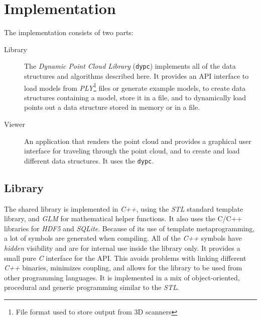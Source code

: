 \documentclass[a4paper,10pt,abstracton,notitlepage]{scrreprt}
\begin{document}
\chapter{Implementation}
The implementation consists of two parts:
\begin{description}
\item[Library] The \emph{Dynamic Point Cloud Library} (\texttt{dypc}) implements all of the data structures and algorithms described here. It provides an API interface to load models from \emph{PLY}\footnote{File format used to store output from 3D scanners} files or generate example models, to create data structures containing a model, store it in a file, and to dynamically load points out a data structure stored in memory or in a file.
\item[Viewer] An application that renders the point cloud and provides a graphical user interface for traveling through the point cloud, and to create and load different data structures. It uses the \texttt{dypc}.
\end{description}

\section{Library}
The shared library is implemented in \emph{C++}, using the \emph{STL} standard template library, and \emph{GLM} for mathematical helper functions. It also uses the C/C++ libraries for \emph{HDF5} and \emph{SQLite}. Because of its use of template metaprogramming, a lot of symbols are generated when compiling. All of the \emph{C++} symbols have \emph{hidden} visibility and are for internal use inside the library only. It provides a small pure \emph{C} interface for the API. This avoids problems with linking different \emph{C++} binaries, minimizes coupling, and allows for the library to be used from other programming languages. It is implemented in a mix of object-oriented, procedural and generic programming similar to the \emph{STL}.
\end{document}
